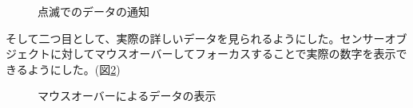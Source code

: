 \begin{figure}[htbp]
  \begin{minipage}{0.5\hsize}
    \begin{center}
    \end{center}
  \end{minipage}
  \begin{minipage}{0.5\hsize}
    \begin{center}
    \end{center}
  \end{minipage}
  \caption{点滅でのデータの通知}
  \label{fig:image01}
\end{figure}


そして二つ目として、実際の詳しいデータを見られるようにした。センサーオブジェクトに対してマウスオーバーしてフォーカスすることで実際の数字を表示できるようにした。(図\ref{fig:image02})

\begin{figure}[htbp]
    \begin{center}
    \end{center}
    \caption{マウスオーバーによるデータの表示}
    \label{fig:image02}
\end{figure}

